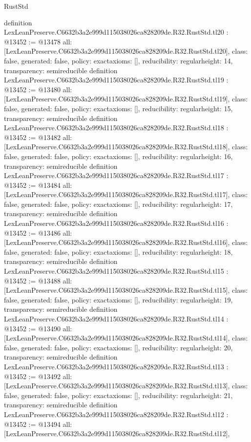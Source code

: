 \begin{lexlean}{RustStd}
\begin{coremodule}
{}
definition LexLeanPreserve.C6632b3a2e999d115038026ca828209de.R32.RustStd.tl20 : @13452 := @13478 {
  all: [LexLeanPreserve.C6632b3a2e999d115038026ca828209de.R32.RustStd.tl20],
  class: false,
  generated: false,
  policy: exact{axioms: []},
  reducibility: regular{height: 14},
  transparency: semireducible
}
definition LexLeanPreserve.C6632b3a2e999d115038026ca828209de.R32.RustStd.tl19 : @13452 := @13480 {
  all: [LexLeanPreserve.C6632b3a2e999d115038026ca828209de.R32.RustStd.tl19],
  class: false,
  generated: false,
  policy: exact{axioms: []},
  reducibility: regular{height: 15},
  transparency: semireducible
}
definition LexLeanPreserve.C6632b3a2e999d115038026ca828209de.R32.RustStd.tl18 : @13452 := @13482 {
  all: [LexLeanPreserve.C6632b3a2e999d115038026ca828209de.R32.RustStd.tl18],
  class: false,
  generated: false,
  policy: exact{axioms: []},
  reducibility: regular{height: 16},
  transparency: semireducible
}
definition LexLeanPreserve.C6632b3a2e999d115038026ca828209de.R32.RustStd.tl17 : @13452 := @13484 {
  all: [LexLeanPreserve.C6632b3a2e999d115038026ca828209de.R32.RustStd.tl17],
  class: false,
  generated: false,
  policy: exact{axioms: []},
  reducibility: regular{height: 17},
  transparency: semireducible
}
definition LexLeanPreserve.C6632b3a2e999d115038026ca828209de.R32.RustStd.tl16 : @13452 := @13486 {
  all: [LexLeanPreserve.C6632b3a2e999d115038026ca828209de.R32.RustStd.tl16],
  class: false,
  generated: false,
  policy: exact{axioms: []},
  reducibility: regular{height: 18},
  transparency: semireducible
}
definition LexLeanPreserve.C6632b3a2e999d115038026ca828209de.R32.RustStd.tl15 : @13452 := @13488 {
  all: [LexLeanPreserve.C6632b3a2e999d115038026ca828209de.R32.RustStd.tl15],
  class: false,
  generated: false,
  policy: exact{axioms: []},
  reducibility: regular{height: 19},
  transparency: semireducible
}
definition LexLeanPreserve.C6632b3a2e999d115038026ca828209de.R32.RustStd.tl14 : @13452 := @13490 {
  all: [LexLeanPreserve.C6632b3a2e999d115038026ca828209de.R32.RustStd.tl14],
  class: false,
  generated: false,
  policy: exact{axioms: []},
  reducibility: regular{height: 20},
  transparency: semireducible
}
definition LexLeanPreserve.C6632b3a2e999d115038026ca828209de.R32.RustStd.tl13 : @13452 := @13492 {
  all: [LexLeanPreserve.C6632b3a2e999d115038026ca828209de.R32.RustStd.tl13],
  class: false,
  generated: false,
  policy: exact{axioms: []},
  reducibility: regular{height: 21},
  transparency: semireducible
}
definition LexLeanPreserve.C6632b3a2e999d115038026ca828209de.R32.RustStd.tl12 : @13452 := @13494 {
  all: [LexLeanPreserve.C6632b3a2e999d115038026ca828209de.R32.RustStd.tl12],
}
\end{coremodule}
\end{lexlean}
